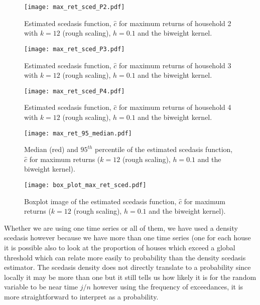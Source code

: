 \documentclass[a4paper]{article}
\begin{document}
\begin{figure}
\centering
\texttt{[image: max\_ret\_sced\_P2.pdf]}
\caption{\label{fig:max_ret_sced_P2} Estimated scedasis function, $\hat{c}$ for maximum returns of household 2 with $k=12$ (rough scaling), $h=0.1$ and the biweight kernel.}
\end{figure}

\begin{figure}
\centering
\texttt{[image: max\_ret\_sced\_P3.pdf]}
\caption{\label{fig:max_ret_sced_P3} Estimated scedasis function, $\hat{c}$ for maximum returns of household 3 with $k=12$ (rough scaling), $h=0.1$ and the biweight kernel.}
\end{figure}

\begin{figure}
\centering
\texttt{[image: max\_ret\_sced\_P4.pdf]}
\caption{\label{fig:max_ret_sced_P4} Estimated scedasis function, $\hat{c}$ for maximum returns of household 4 with $k=12$ (rough scaling), $h=0.1$ and the biweight kernel.}
\end{figure}

\begin{figure}
\centering
\texttt{[image: max\_ret\_95\_median.pdf]}
\caption{\label{fig:max_ret_sced_95_50} Median (red) and $95^{th}$ percentile of the estimated scedasis function, $\hat{c}$ for maximum returns ($k=12$ (rough scaling), $h=0.1$ and the biweight kernel).}
\end{figure}

\begin{figure}
\centering
\texttt{[image: box\_plot\_max\_ret\_sced.pdf]}
\caption{\label{fig:max_ret_sced_boxplot} Boxplot image of the estimated scedasis function, $\hat{c}$ for maximum returns ($k=12$ (rough scaling), $h=0.1$ and the biweight kernel).}
\end{figure}


Whether we are using one time series or all of them, we have used a density scedasis however because we have more than one time series (one for each house it is possible also to look at the proportion of houses which exceed a global threshold which can relate more easily to probability than the density scedasis estimator. The scedasis density does not directly translate to a probability since locally it may be more than one but it still tells us how likely it is for the random variable to be near time $j/n$ however using the frequency of exceedances, it is more straightforward to interpret as a probability.
\end{document}
